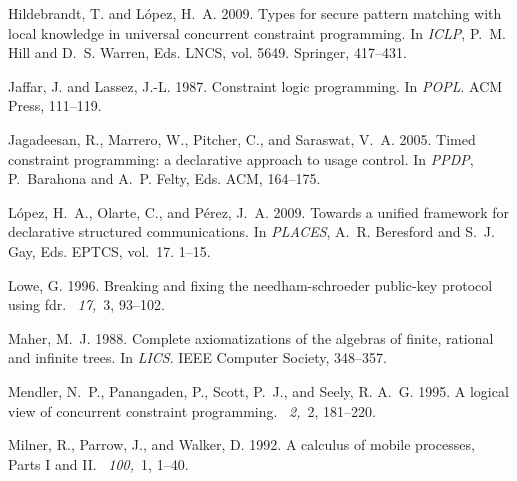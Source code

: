 \documentclass{tlp}
\begin{document}
\begin{thebibliography}{}
{\sc Hildebrandt, T.} {\sc and} {\sc L{\'o}pez, H.~A.} 2009.
\newblock Types for secure pattern matching with local knowledge in universal
  concurrent constraint programming.
\newblock In {\em ICLP}, {P.~M. Hill} {and} {D.~S. Warren}, Eds. LNCS, vol.
  5649. Springer, 417--431.

{\sc Jaffar, J.} {\sc and} {\sc Lassez, J.-L.} 1987.
\newblock Constraint logic programming.
\newblock In {\em POPL}. ACM Press, 111--119.

{\sc Jagadeesan, R.}, {\sc Marrero, W.}, {\sc Pitcher, C.}, {\sc and} {\sc
  Saraswat, V.~A.} 2005.
\newblock Timed constraint programming: a declarative approach to usage
  control.
\newblock In {\em PPDP}, {P.~Barahona} {and} {A.~P. Felty}, Eds. ACM, 164--175.

{\sc L{\'o}pez, H.~A.}, {\sc Olarte, C.}, {\sc and} {\sc P{\'e}rez, J.~A.}
  2009.
\newblock Towards a unified framework for declarative structured
  communications.
\newblock In {\em PLACES}, {A.~R. Beresford} {and} {S.~J. Gay}, Eds. EPTCS,
  vol.~17. 1--15.

{\sc Lowe, G.} 1996.
\newblock Breaking and fixing the needham-schroeder public-key protocol using
  fdr.
~{\em 17,\/}~3, 93--102.

{\sc Maher, M.~J.} 1988.
\newblock Complete axiomatizations of the algebras of finite, rational and
  infinite trees.
\newblock In {\em LICS}. IEEE Computer Society, 348--357.

{\sc Mendler, N.~P.}, {\sc Panangaden, P.}, {\sc Scott, P.~J.}, {\sc and} {\sc
  Seely, R. A.~G.} 1995.
\newblock A logical view of concurrent constraint programming.
~{\em 2,\/}~2, 181--220.

{\sc Milner, R.}, {\sc Parrow, J.}, {\sc and} {\sc Walker, D.} 1992.
\newblock A calculus of mobile processes, {P}arts {I} and {II}.
~{\em 100,\/}~1, 1--40.


\end{thebibliography}
\end{document}
